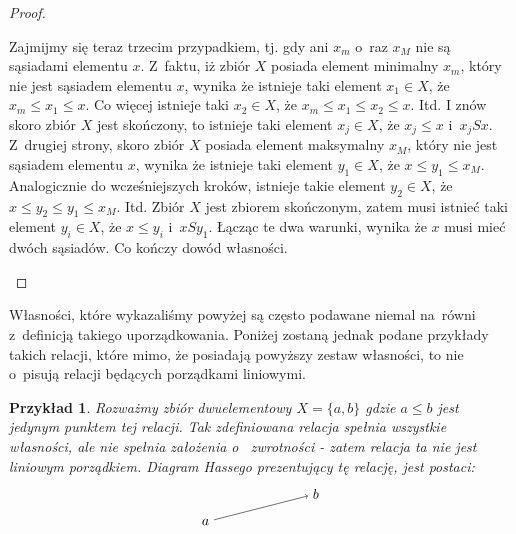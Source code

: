 \documentclass[12pt,a4paper]{report}
\newtheorem{example}{Przykład}
\begin{document}
\begin{proof}
\begin{enumerate}
\begin{itemize}
Zajmijmy się teraz trzecim przypadkiem, tj. gdy ani $x_m$ o~raz $x_M$ nie są sąsiadami elementu $x$. Z~faktu, iż zbiór $X$ posiada element minimalny $x_m$, który nie jest sąsiadem elementu $x$, wynika że istnieje taki element $x_1 \in X$, że $x_m \leq x_1 \leq x$. Co więcej istnieje taki $x_2 \in X$, że $x_m \leq x_1 \leq x_2 \leq x.$ Itd. I znów skoro zbiór $X$ jest skończony, to istnieje taki element $x_j \in X$, że $x_j \leq x$ i~$x_jSx$. Z~drugiej strony, skoro zbiór $X$ posiada element maksymalny $x_M$, który nie jest sąsiadem elementu $x$, wynika że istnieje taki element $y_1 \in X$, że $x \leq y_1 \leq x_M$. Analogicznie do wcześniejszych kroków, istnieje takie element $y_2 \in X$, że $x \leq y_2 \leq y_1 \leq x_M$. Itd.  Zbiór $X$ jest zbiorem skończonym, zatem musi istnieć taki element $y_i \in X$, że $x \leq y_i$ i~$xSy_1$. 
Łącząc te dwa warunki, wynika że $x$ musi mieć dwóch sąsiadów. Co kończy dowód własności.

\end{itemize}

\end{enumerate}
\end{proof}

Własności, które wykazaliśmy powyżej są często podawane niemal na~równi z~definicją takiego uporządkowania. Poniżej zostaną jednak podane przykłady takich relacji, które mimo, że posiadają powyższy zestaw własności, to nie o~pisują relacji będących porządkami liniowymi. 
 
\begin{example}
Rozważmy zbiór dwuelementowy $X = \{ a, b \}$ gdzie $a \leq b$ jest jedynym punktem tej relacji. Tak zdefiniowana relacja spełnia wszystkie własności, ale nie spełnia założenia o~ zwrotności - zatem relacja ta nie jest liniowym porządkiem. Diagram Hassego prezentujący tę relację, jest postaci: 
$$
\begin{tikzpicture}[scale=.7]
  \node (a) at (-2,0) {$a$};
  \node (b) at (2,1) {$b$};
  \draw [->](a)--(b) ;
\end{tikzpicture}
$$
\end{example}
\end{document}
